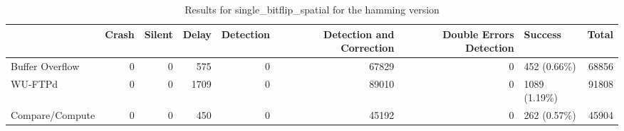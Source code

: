 \begin{table}[t]
	\centering
	\caption{Results for single_bitflip_spatial for the hamming version}
	\label{table:end_sim_by_status_hamming_1_single_bitflip_spatial}
	\begin{tabular}{lrrrrrrlr}
		\toprule
		                & Crash & Silent & Delay & Detection & Detection and Correction & Double Errors Detection & Success       & Total \\
		\midrule
		Buffer Overflow & 0     & 0      & 575   & 0         & 67829                    & 0                       & 452 (0.66\%)  & 68856 \\
		WU-FTPd         & 0     & 0      & 1709  & 0         & 89010                    & 0                       & 1089 (1.19\%) & 91808 \\
		Compare/Compute & 0     & 0      & 450   & 0         & 45192                    & 0                       & 262 (0.57\%)  & 45904 \\
		\bottomrule
	\end{tabular}
\end{table}
